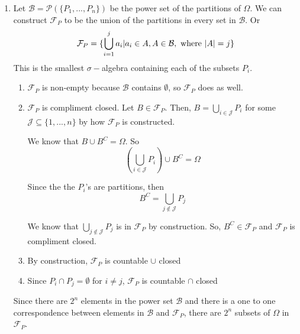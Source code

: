 \documentclass[12pt]{article}
\begin{document}

\begin{enumerate}[start=1,label={\bfseries Problem \arabic*:},leftmargin=1in] %
    \item Let $\mathcal{B} = \mathcal{P}(\{P_1, ..., P_n\})$ be the power set of the partitions of $\Omega$. 
    We can construct $\mathcal{F}_P$ to be the union of the partitions in every set in $\mathcal{B}$. 
    Or \[
        \mathcal{F}_P = \{ \bigcup_{i=1}^j a_i | a_i \in A, A \in \mathcal{B}, \textnormal{ where } |A| = j\}
    \]
    This is the smallest $\sigma-$algebra containing each of the subsets $P_i$. 

    \begin{enumerate}
        \item $\mathcal{F}_P$ is non-empty because $\mathcal{B}$ contains $\emptyset$, so $\mathcal{F}_P$ does as well.
        \item $\mathcal{F}_P$ is compliment closed. Let $B \in \mathcal{F}_P$.
        Then, $B = \bigcup_{i\in \mathcal{J}} P_i$ for some $\mathcal{J} \subseteq \{1, ..., n\}$ by how $\mathcal{F}_P$ is constructed. 
        
        We know that $B \cup B^C = \Omega$. So 
        \[
            (\bigcup_{i\in \mathcal{J}} P_i) \cup B^C = \Omega
        \]

        Since the the $P_i$'s are partitions, then 
        \[
            B^C = \bigcup_{j \not \in \mathcal{J}} P_j
        \]

        We know that $ \bigcup_{j \not \in \mathcal{J}} P_j$ is in $\mathcal{F}_{P}$ 
        by construction. So, $B^C \in \mathcal{F}_P$ and $\mathcal{F}_P$ is compliment closed. 

        \item By construction, $\mathcal{F}_P$ is countable $\cup$ closed
        \item Since $P_{i} \cap P_{j} = \emptyset$ for $i \neq j$, $\mathcal{F}_{P}$ is countable $\cap$ closed 
    \end{enumerate}    
    Since there are $2^n$ elements in the power set $\mathcal{B}$ and there is a one to one correspondence
    between elements in $\mathcal{B}$ and $\mathcal{F}_{P}$, there are $2^n$ subsets of $\Omega$ in $\mathcal{F}_P$. 
    

\end{enumerate}
\end{document}
